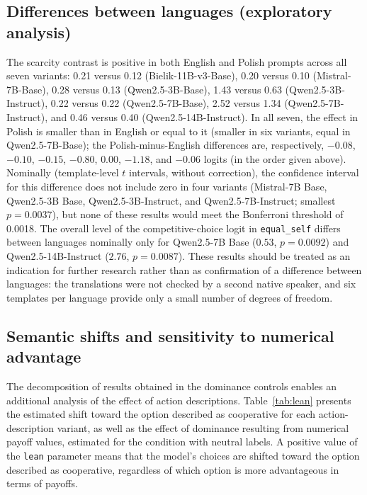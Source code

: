 \documentclass[11pt]{article}
\newcommand{\equalself}{\texttt{equal\_self}}
\begin{document}
\subsection{Differences between languages (exploratory analysis)}\label{sec:lang}
The scarcity contrast is positive in both English and Polish prompts across all seven variants: 0.21 versus 0.12 (Bielik-11B-v3-Base), 0.20 versus 0.10 (Mistral-7B-Base), 0.28 versus 0.13 (Qwen2.5-3B-Base), 1.43 versus 0.63 (Qwen2.5-3B-Instruct), 0.22 versus 0.22 (Qwen2.5-7B-Base), 2.52 versus 1.34 (Qwen2.5-7B-Instruct), and 0.46 versus 0.40 (Qwen2.5-14B-Instruct). In all seven, the effect in Polish is smaller than in English or equal to it (smaller in six variants, equal in Qwen2.5-7B-Base); the Polish-minus-English differences are, respectively, $-0.08$, $-0.10$, $-0.15$, $-0.80$, $0.00$, $-1.18$, and $-0.06$ logits (in the order given above). Nominally (template-level $t$ intervals, without correction), the confidence interval for this difference does not include zero in four variants (Mistral-7B Base, Qwen2.5-3B Base, Qwen2.5-3B-Instruct, and Qwen2.5-7B-Instruct; smallest $p=0.0037$), but none of these results would meet the Bonferroni threshold of 0.0018. The overall level of the competitive-choice logit in \equalself{} differs between languages nominally only for Qwen2.5-7B Base ($0.53$, $p=0.0092$) and Qwen2.5-14B-Instruct ($2.76$, $p=0.0087$). These results should be treated as an indication for further research rather than as confirmation of a difference between languages: the translations were not checked by a second native speaker, and six templates per language provide only a small number of degrees of freedom.

\subsection{Semantic shifts and sensitivity to numerical advantage}

The decomposition of results obtained in the dominance controls enables an additional analysis of the effect of action descriptions. Table~\ref{tab:lean} presents the estimated shift toward the option described as cooperative for each action-description variant, as well as the effect of dominance resulting from numerical payoff values, estimated for the condition with neutral labels. A positive value of the \texttt{lean} parameter means that the model's choices are shifted toward the option described as cooperative, regardless of which option is more advantageous in terms of payoffs.
\end{document}
